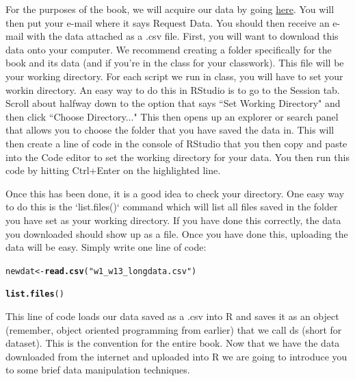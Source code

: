 \documentclass[11pt,openany]{book}\usepackage[]{graphicx}\usepackage[]{color}
\makeatletter
\newcommand{\hlstr}[1]{\textcolor[rgb]{0.192,0.494,0.8}{#1}}%
\newcommand{\hlstd}[1]{\textcolor[rgb]{0.345,0.345,0.345}{#1}}%
\newcommand{\hlkwb}[1]{\textcolor[rgb]{0.69,0.353,0.396}{#1}}%
\newcommand{\hlkwd}[1]{\textcolor[rgb]{0.737,0.353,0.396}{\textbf{#1}}}%
\newenvironment{kframe}{%
 \def\at@end@of@kframe{}%
 \ifinner\ifhmode%
  \def\at@end@of@kframe{\end{minipage}}%
  \begin{minipage}{\columnwidth}%
 \fi\fi%
 \def\FrameCommand##1{\hskip\@totalleftmargin \hskip-\fboxsep
 \colorbox{shadecolor}{##1}\hskip-\fboxsep
     \hskip-\linewidth \hskip-\@totalleftmargin \hskip\columnwidth}%
 \MakeFramed {\advance\hsize-\width
   \@totalleftmargin\z@ \linewidth\hsize
   \@setminipage}}%
 {\par\unskip\endMakeFramed%
 \at@end@of@kframe}
\newenvironment{knitrout}{}{} %
\renewenvironment{knitrout}{\begin{singlespace}}{\end{singlespace}}
\makeatother
\begin{document}
For the purposes of the book, we will acquire our data by going \href{http://crcm.ou.edu/epscordata/}{here}. You will then put your e-mail where it says Request Data. You should then receive an e-mail with the data attached as a .csv file. First, you will want to download this data onto your computer. We recommend creating a folder specifically for the book and its data (and if you're in the class for your classwork). This file will be your working directory. For each script we run in class, you will have to set your workin directory. An easy way to do this in RStudio is to go to the Session tab. Scroll about halfway down to the option that says ``Set Working Directory" and then click ``Choose Directory..." This then opens up an explorer or search panel that allows you to choose the folder that you have saved the data in. This will then create a line of code in the console of RStudio that you then copy and paste into the Code editor to set the working directory for your data. You then run this code by hitting Ctrl+Enter on the highlighted line. 

Once this has been done, it is a good idea to check your directory. One easy way to do this is the `list.files()` command which will list all files saved in the folder you have set as your working directory. If you have done this correctly, the data you downloaded should show up as a file. Once you have done this, uploading the data will be easy. Simply write one line of code:

\begin{knitrout}
\color{fgcolor}\begin{kframe}
\begin{alltt}
\hlstd{newdat} \hlkwb{<-} \hlkwd{read.csv}\hlstd{(}\hlstr{"w1_w13_longdata.csv"}\hlstd{)}
\end{alltt}
\end{kframe}
\end{knitrout}

\begin{knitrout}
\color{fgcolor}\begin{kframe}
\begin{alltt}
\hlkwd{list.files}\hlstd{()}
\end{alltt}
\end{kframe}
\end{knitrout}

This line of code loads our data saved as a .csv into R and saves it as an object (remember, object oriented programming from earlier) that we call ds (short for dataset). This is the convention for the entire book. Now that we have the data downloaded from the internet and uploaded into R we are going to introduce you to some brief data manipulation techniques.
\end{document}

